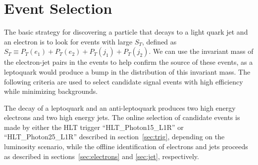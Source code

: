 %

\section{Event Selection} \label{sec:eventSelection}


The basic strategy for discovering a 
particle that decays to a light quark jet and an electron 
is to look for events with large $S_T$, defined as
$S_T\equiv P_T(e_1)+P_T(e_2)+P_T(j_1)+P_T(j_2)$.
We can use
the invariant mass of the electron-jet pairs in the events to help
confirm the source of these events, as a leptoquark would produce 
a bump in the distribution of this invariant mass.
The following criteria are used to select candidate signal events
with high efficiency
while minimizing backgrounds.

%
The decay of a leptoquark and an anti-leptoquark produces two high energy electrons and 
two high energy jets.
The online selection of candidate events is made by either the HLT trigger ``HLT\_Photon15\_L1R'' 
or ``HLT\_Photon25\_L1R'' described in section~\ref{sec:trig}, depending on the luminosity scenario, 
while the offline identification of electrons and jets 
proceeds as described in sections~\ref{sec:electrons} and \ref{sec:jet}, respectively.

